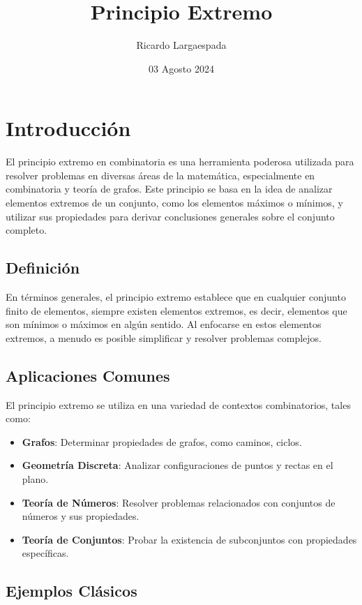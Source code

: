 \documentclass[11pt]{scrartcl}
\begin{document}
\title{Principio Extremo}
\author{Ricardo Largaespada}
\date{03 Agosto 2024}

\maketitle
\section{Introducción}

El principio extremo en combinatoria es una herramienta poderosa utilizada para resolver problemas en diversas áreas de la matemática, especialmente en combinatoria y teoría de grafos. Este principio se basa en la idea de analizar elementos extremos de un conjunto, como los elementos máximos o mínimos, y utilizar sus propiedades para derivar conclusiones generales sobre el conjunto completo.

\subsection*{Definición}

En términos generales, el principio extremo establece que en cualquier conjunto finito de elementos, siempre existen elementos extremos, es decir, elementos que son mínimos o máximos en algún sentido. Al enfocarse en estos elementos extremos, a menudo es posible simplificar y resolver problemas complejos.

\subsection*{Aplicaciones Comunes}

El principio extremo se utiliza en una variedad de contextos combinatorios, tales como:

\begin{itemize}
    \item \textbf{Grafos}: Determinar propiedades de grafos, como caminos, ciclos.
    \item \textbf{Geometría Discreta}: Analizar configuraciones de puntos y rectas en el plano.
    \item \textbf{Teoría de Números}: Resolver problemas relacionados con conjuntos de números y sus propiedades.
    \item \textbf{Teoría de Conjuntos}: Probar la existencia de subconjuntos con propiedades específicas.
\end{itemize}

\subsection*{Ejemplos Clásicos}
\end{document}
